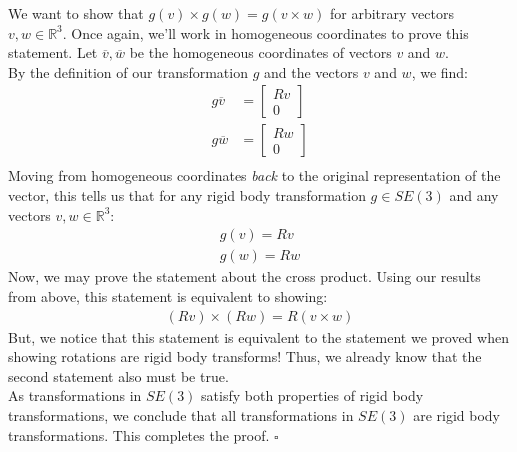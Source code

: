 \documentclass[oneside]{book}
\begin{document}
We want to show that $g(v) \times g(w) = g(v\times w)$ for arbitrary vectors $v, w \in \mathbb{R}^3$. Once again, we'll work in homogeneous coordinates to prove this statement. Let $\overline{v}, \overline{w}$ be the homogeneous coordinates of vectors $v$ and $w$.\\
By the definition of our transformation $g$ and the vectors $v$ and $w$, we find:
\begin{align}
    g\overline{v} &= \begin{bmatrix}
    Rv\\
    0
    \end{bmatrix}\\
    g\overline{w} &= \begin{bmatrix}
    Rw\\
    0
    \end{bmatrix}\\
\end{align}
Moving from homogeneous coordinates \textit{back} to the original representation of the vector, this tells us that for any rigid body transformation $g\in SE(3)$ and any vectors $v, w \in \mathbb{R}^3$:
\begin{align}
    g(v) = Rv\\
    g(w) = Rw
\end{align}
Now, we may prove the statement about the cross product. Using our results from above, this statement is equivalent to showing:
\begin{align}
    (Rv)\times(Rw) = R(v\times w)
\end{align}
But, we notice that this statement is equivalent to the statement we proved when showing rotations are rigid body transforms! Thus, we already know that the second statement also must be true.\\
As transformations in $SE(3)$ satisfy both properties of rigid body transformations, we conclude that all transformations in $SE(3)$ are rigid body transformations. This completes the proof. $\square$
\end{document}
